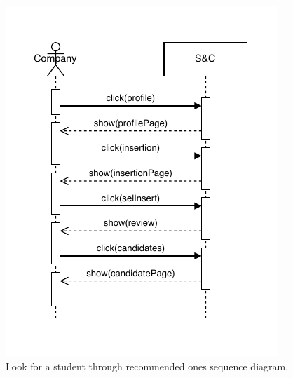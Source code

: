 \begin{figure}[H]
    \begin{center}
        \includegraphics[width=\linewidth]{Images/SequenceDiagram/LookStudentSD2.pdf}
        \caption{Look for a student through recommended ones sequence diagram.}
        \label{fig:look_student_seqdiag}%
    \end{center}
\end{figure}



